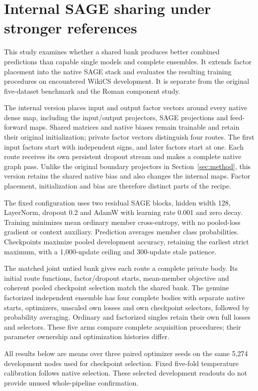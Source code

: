 \section{Internal SAGE sharing under stronger references}\label{sec:internal-sage}
This study examines whether a shared bank produces better combined predictions than capable single models and complete ensembles. It extends factor placement into the native SAGE stack and evaluates the resulting training procedures on encountered WikiCS development. It is separate from the original five-dataset benchmark and the Roman component study.

The internal version places input and output factor vectors around every native dense map, including the input/output projectors, SAGE projections and feed-forward maps. Shared matrices and native biases remain trainable and retain their original initialization; private factor vectors distinguish four routes. The first input factors start with independent signs, and later factors start at one. Each route receives its own persistent dropout stream and makes a complete native graph pass. Unlike the original boundary projectors in Section~\ref{sec:method}, this version retains the shared native bias and also changes the internal maps. Factor placement, initialization and bias are therefore distinct parts of the recipe.

The fixed configuration uses two residual SAGE blocks, hidden width 128, LayerNorm, dropout 0.2 and AdamW with learning rate 0.001 and zero decay. Training minimizes mean ordinary member cross-entropy, with no pooled-loss gradient or context auxiliary. Prediction averages member class probabilities. Checkpoints maximize pooled development accuracy, retaining the earliest strict maximum, with a 1,000-update ceiling and 300-update stale patience.

The matched joint untied bank gives each route a complete private body. Its initial route functions, factor/dropout starts, mean-member objective and coherent pooled checkpoint selection match the shared bank. The genuine factorized independent ensemble has four complete bodies with separate native starts, optimizers, unscaled own losses and own checkpoint selectors, followed by probability averaging. Ordinary and factorized singles retain their own full losses and selectors. These five arms compare complete acquisition procedures; their parameter ownership and optimization histories differ.

All results below are means over three paired optimizer seeds on the same 5,274 development nodes used for checkpoint selection. Fixed five-fold temperature calibration follows native selection. These selected development readouts do not provide unused whole-pipeline confirmation.

